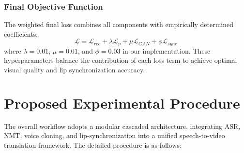 \documentclass[12pt,oneside]{report}
\begin{document}
\subsubsection{Final Objective Function}
The weighted final loss combines all components with empirically determined coefficients:
\begin{equation}
\mathcal{L} = \mathcal{L}_{rec} + \lambda \mathcal{L}_p + \mu \mathcal{L}_{GAN} + \phi \mathcal{L}_{sync}
\end{equation}
where $\lambda = 0.01$, $\mu = 0.01$, and $\phi = 0.03$ in our implementation. These hyperparameters balance the contribution of each loss term to achieve optimal visual quality and lip synchronization accuracy.

\section{Proposed Experimental Procedure}

The overall workflow adopts a modular cascaded architecture, integrating ASR, NMT, voice cloning, and lip-synchronization into a unified speech-to-video translation framework. The detailed procedure is as follows:
\end{document}
